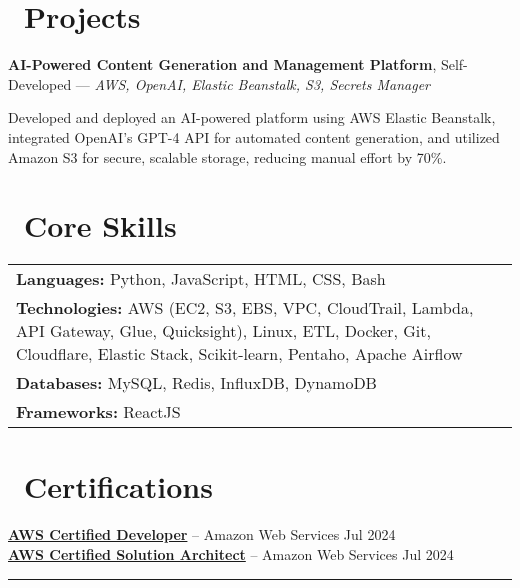 \documentclass[10pt, letterpaper]{article}
\begin{document}
\section{\faLaptopCode \ Projects}
\textbf{\textcolor{myNavy}{AI-Powered Content Generation and Management Platform}}, Self-Developed — \textit{\textcolor{myBlue}{AWS, OpenAI, Elastic Beanstalk, S3, Secrets Manager}}

Developed and deployed an AI-powered platform using AWS Elastic Beanstalk, integrated OpenAI's GPT-4 API for automated content generation, and utilized Amazon S3 for secure, scalable storage, \textcolor{myAccent}{reducing manual effort by 70\%}.

\vspace{0.1cm}

\section{\faTools \ Core Skills}
\begin{tabularx}{\textwidth}{>{\raggedright\arraybackslash}X}
\textcolor{myNavy}{\textbf{Languages:}} Python, JavaScript, HTML, CSS, Bash \\
\textcolor{myNavy}{\textbf{Technologies:}} AWS (EC2, S3, EBS, VPC, CloudTrail, Lambda, API Gateway, Glue, Quicksight), Linux, ETL, Docker, Git, Cloudflare, Elastic Stack, Scikit-learn, Pentaho, Apache Airflow\\
\textcolor{myNavy}{\textbf{Databases:}} MySQL, Redis, InfluxDB, DynamoDB \\
\textcolor{myNavy}{\textbf{Frameworks:}} ReactJS \\
\end{tabularx}

\vspace{0.1cm}

\section{\faCertificate \ Certifications}
\textbf{\href{https://cp.certmetrics.com/amazon/en/public/verify/credential/dc7c20379cf94f2699a4d430c31ac969}{AWS Certified Developer}} -- Amazon Web Services \hfill \textcolor{myDarkGray}{Jul 2024} \\
\textbf{\href{https://cp.certmetrics.com/amazon/en/public/verify/credential/7ec7fce4db1f4b1bab3b6f8caa3f509b}{AWS Certified Solution Architect}} -- Amazon Web Services \hfill \textcolor{myDarkGray}{Jul 2024}

\vspace{0.1cm}
\noindent\textcolor{myAccent}{\rule{\textwidth}{0.4pt}}
\end{document}
